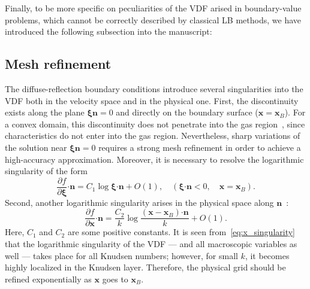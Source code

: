 \documentclass{article}
\newcommand{\pder}[2][]{\frac{\partial#1}{\partial#2}}
\newcommand{\OO}[1]{O(#1)}
\newcommand{\bxi}{\boldsymbol{\xi}}
\newcommand{\bn}{\boldsymbol{n}}
\newcommand{\bdot}{\boldsymbol{\cdot}}
\newcommand{\bx}{\boldsymbol{x}}
\begin{document}
\begin{leftbar}
\end{leftbar}


Finally, to be more specific on peculiarities of the VDF arised in boundary-value problems,
which cannot be correctly described by classical LB methods,
we have introduced the following subsection into the manuscript:
\begin{leftbar}
    \subsection*{Mesh refinement}
    The diffuse-reflection boundary conditions introduce several singularities into the VDF
    both in the velocity space and in the physical one.
    First, the discontinuity exists along the plane \(\bxi\bn=0\) and directly on the boundary surface (\(\bx=\bx_B\)).
    For a convex domain, this discontinuity does not penetrate into the gas region~\cite{Kim2011, Guo2017},
    since characteristics do not enter into the gas region.
    Nevertheless, sharp variations of the solution near \(\bxi\bn=0\) requires a strong mesh refinement
    in order to achieve a high-accuracy approximation.
    Moreover, it is necessary to resolve the logarithmic singularity of the form~\cite{Takata2016}
    \begin{equation}\label{eq:xi_singularity}
        \pder[f]{\bxi}\bdot\bn = C_1\log\bxi\bdot\bn + \OO{1}, \quad (\bxi\bdot\bn<0, \quad \bx=\bx_B).
    \end{equation}
    Second, another logarithmic singularity arises in the physical space along \(\bn\)~\cite{Takata2014}:
    \begin{equation}\label{eq:x_singularity}
        \pder[f]{\bx}\bdot\bn = \frac{C_2}{k}\log\frac{(\bx-\bx_B)\bdot\bn}{k} + \OO{1}.
    \end{equation}
    Here, \(C_1\) and \(C_2\) are some positive constants.
    It is seen from~\eqref{eq:x_singularity} that the logarithmic singularity of the VDF
    --- and all macroscopic variables as well --- takes place for all Knudsen numbers;
    however, for small \(k\), it becomes highly localized in the Knudsen layer.
    Therefore, the physical grid should be refined exponentially as \(\bx\) goes to \(\bx_B\).
\end{leftbar}
\end{document}
